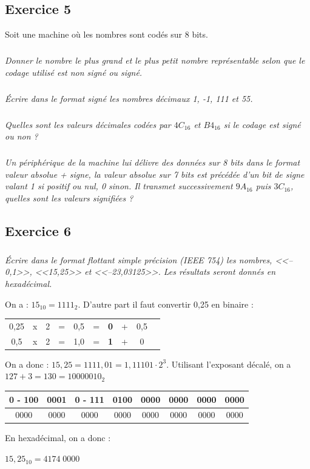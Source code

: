 \documentclass[10pt,fleqn]{article} %
\begin{document}
\begin{multicols}{2}
\subsection*{Exercice 5}
\setcounter{subparagraph}{0}
Soit une machine où les nombres sont codés sur 8 bits.
\subparagraph{}\textit{Donner le nombre le plus grand et le plus petit nombre représentable selon que le codage utilisé est non signé ou signé. }
\subparagraph{}\textit{Écrire dans le format signé les nombres décimaux 1, -1, 111 et 55.}
\subparagraph{}\textit{Quelles sont  les valeurs décimales codées par $4C_{16}$ et $B4_{16}$ si le codage est signé ou non ?}
\subparagraph{}\textit{Un périphérique de la machine lui délivre des données sur 8 bits dans le format valeur absolue + signe, la valeur absolue sur 7 bits est précédée d’un bit de signe valant 1 si positif ou nul, 0 sinon. Il transmet successivement $9A_{16}$ puis $3C_{16}$, quelles sont les valeurs signifiées ? }

\subsection*{Exercice 6}
\setcounter{subparagraph}{0}
\subparagraph*{}\textit{Écrire dans le format flottant simple précision (IEEE 754) les nombres,  	<<–0,1>>,  	<<15,25>>  et <<–23,03125>>. Les résultats seront donnés en hexadécimal.}
\ifprof

\begin{corrige}
On a : $15_{10}=1111_2$. D'autre part il faut convertir 0,25 en binaire : 

\begin{tabular}{cccccccccc}
0,25 & x & 2 & = & 0,5 & =& \textbf{0} & + & 0,5 \\
0,5 & x & 2 & = & 1,0 & =& \textbf{1} & + & 0 \\
\end{tabular}

On a donc : $15,25=1111,01 = 1,11101 \cdot 2^{3}$. Utilisant l'exposant décalé, on a $127+3 = 130=10000010_2$

\noindent \begin{tabular}{|c|c|c|c|c|c|c|c|}
\hline
0 - 100&0001 & 0 - 111& 0100& 0000& 0000& 0000& 0000 \\
\hline
0000 & 0000& 0000& 0000& 0000& 0000& 0000& 0000 \\
\hline
\end{tabular}

En hexadécimal, on a donc :

 $15,25_{10} =4174\; 0000 $



\end{corrige}
\end{multicols}
\end{document}
